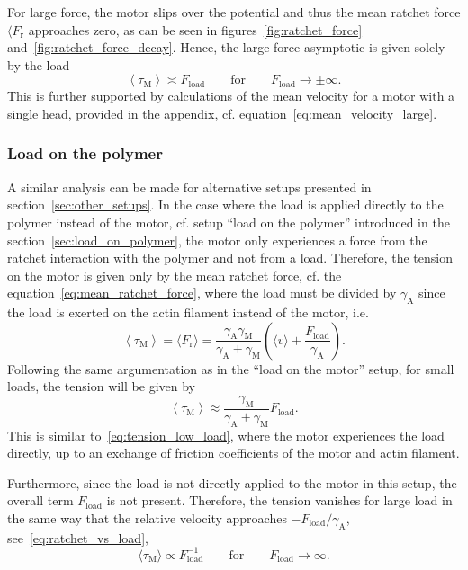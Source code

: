 \documentclass[aps,pre,twocolumn,showpacs,showkeys,superscriptaddress,floatfix]{revtex4-1}
\begin{document}
For large force, the motor slips over the potential and thus the mean ratchet force $\langle F_\text{r}$ approaches zero,
as can be seen in figures~\ref{fig:ratchet_force} and~\ref{fig:ratchet_force_decay}.
Hence, the large force asymptotic is given solely by the load
\begin{equation}
\left\langle \tau_\text{M} \right\rangle
\asymp F_\text{load} 
\qquad \text{for} \qquad F_\text{load} \to \pm \infty. 
\label{eq:tension_large_load}
\end{equation}
This is further supported by calculations of the mean velocity for a motor with a single head, provided in the appendix, cf. equation~\eqref{eq:mean_velocity_large}.


\subsubsection{Load on the polymer}
A similar analysis can be made for alternative setups presented in section~\ref{sec:other_setups}. 
In the case where the load is applied directly to the polymer instead of the motor, cf. setup ``load on the polymer'' introduced in the section~\ref{sec:load_on_polymer}, 
the motor only experiences a force from the ratchet interaction with the polymer and not from a load. 
Therefore, the tension on the motor is given only by the mean ratchet force,  
cf. the equation~\eqref{eq:mean_ratchet_force},  
where the load must be divided by $\gamma_\text{A}$ since the load is exerted on the actin filament instead of the motor,
i.e.
\begin{equation}
\left\langle \tau_\text{M} \right\rangle 
= \langle F_\text{r} \rangle 
= \frac{\gamma_\text{A}\gamma_\text{M}}{\gamma_\text{A} + \gamma_\text{M} } \left(\langle v \rangle + \frac{F_\text{load}}{\gamma_\text{A}}\right) . 
\label{eq:tension_load_on_polymer}
\end{equation}
Following the same argumentation as in the ``load on the motor'' setup, for small loads, the tension will be given by
\begin{equation}
\left\langle \tau_\text{M} \right\rangle
\approx \frac{\gamma_\text{M}}{\gamma_\text{A}+\gamma_\text{M}} F_\text{load}.
\label{eq:tension_low_load_on_polymer}
\end{equation}
This is similar to~\eqref{eq:tension_low_load}, where the motor experiences the load directly, up to an exchange of friction coefficients of the motor and actin filament. 

Furthermore, since the load is not directly applied to the motor in this setup, the overall term $F_\text{load}$ is not present. 
Therefore, the tension vanishes for large load in the same way that the relative velocity approaches $-F_\text{load} / \gamma_\text{A}$, see~\eqref{eq:ratchet_vs_load},
\begin{equation}
\langle \tau_\text{M} \rangle 
\propto
F_\text{load}^{-1}
\qquad\text{for}\qquad
F_\text{load} \to \infty 
.
\label{eq:tension_load_on_polymer_large}
\end{equation}
\end{document}
